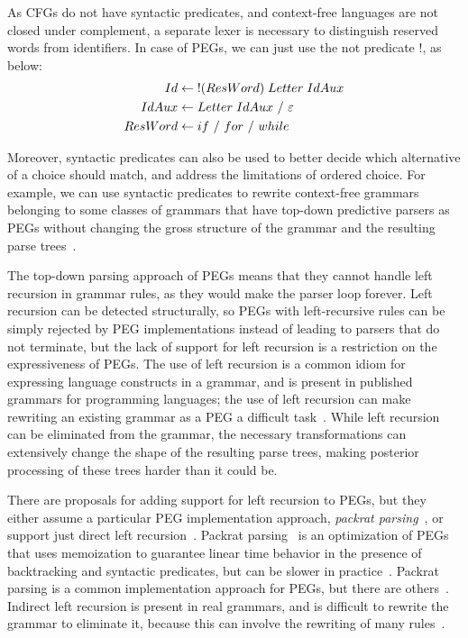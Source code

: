 As CFGs do not have syntactic predicates, and context-free languages are not closed under complement,
 a separate lexer is necessary to distinguish reserved
words from identifiers. In case of PEGs, we can just use the not predicate
$!$, as below: 
\begin{align*}
Id & \leftarrow \;!(ResWord) \; Letter \; IdAux \\
IdAux & \leftarrow Letter \; IdAux \ / \ \Epsi \\
ResWord & \leftarrow if \ / \ for \ / \ while
\end{align*}

Moreover, syntactic predicates can also be used to better decide which
alternative of a choice should match, and address the limitations of ordered choice.
For example, we can use syntactic predicates to rewrite context-free grammars belonging to
some classes of grammars that have top-down predictive parsers as PEGs without changing the
gross structure of the grammar and the resulting parse trees~\cite{mascarenhas:cfgpeg}. 

The top-down parsing approach of PEGs means that they cannot handle
left recursion in grammar rules, as they would make the parser loop
forever. Left recursion can be detected structurally, so PEGs with
left-recursive rules can be simply rejected by PEG implementations
instead of leading to parsers that do not terminate, but the lack of
support for left recursion is a restriction on the expressiveness of
PEGs. The use of left recursion is a common idiom for expressing
language constructs in a grammar, and is present in published grammars
for programming languages; the use of left recursion can make
rewriting an existing grammar as a PEG a difficult task~\cite{roman:primitive}.
While left recursion can be eliminated from the grammar, the necessary
transformations can extensively change the shape of the resulting parse trees,
making posterior processing of these trees harder than it could be.

There are proposals for adding support for left recursion to PEGs, but
they either assume a particular PEG implementation
approach, {\em packrat parsing}~\cite{warth:left}, or support just
direct left recursion~\cite{tratt:left}. Packrat parsing~\cite{ford:packrat} is an
optimization of PEGs that uses memoization to guarantee linear time
behavior in the presence of backtracking and syntactic predicates, but
can be slower in practice~\cite{roman:aspects,mizushima}. Packrat parsing is a common
implementation approach for PEGs, but there are
others~\cite{dls:lpeg}. Indirect left recursion is
present in real grammars, and is difficult to rewrite the
grammar to eliminate it, because this can involve the
rewriting of many rules~\cite{roman:primitive}.

